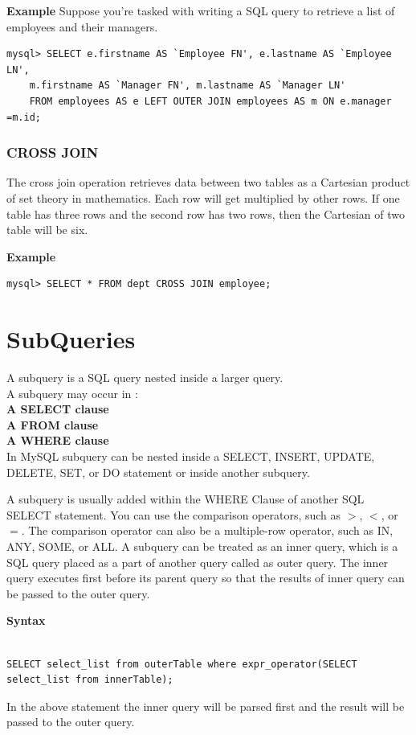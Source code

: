 \documentclass[11pt,a4paper]{article}
\begin{document}
\textbf{Example} Suppose you're tasked with writing a SQL query to retrieve a list of employees and their managers.
\begin{verbatim}mysql> SELECT e.firstname AS `Employee FN', e.lastname AS `Employee LN', 
    m.firstname AS `Manager FN', m.lastname AS `Manager LN' 
    FROM employees AS e LEFT OUTER JOIN employees AS m ON e.manager =m.id;\end{verbatim}

\subsubsection*{CROSS JOIN} The cross join operation retrieves data between two tables as a Cartesian product of set theory in mathematics. Each row will get multiplied by other rows. If one table has three rows and the second row has two rows, then the Cartesian of two table will be six. 

\textbf{Example}

\begin{verbatim}mysql> SELECT * FROM dept CROSS JOIN employee;\end{verbatim}
\section*{SubQueries}
A subquery is a SQL query nested inside a larger query.\\

A subquery may occur in :\\
\textbf{A SELECT clause}\\
\textbf{A FROM clause}\\
\textbf{A WHERE clause}\\

In MySQL subquery can be nested inside a SELECT, INSERT, UPDATE, DELETE, SET, or DO statement or inside another subquery.

A subquery is usually added within the WHERE Clause of another SQL SELECT statement.
You can use the comparison operators, such as $>$, $<$, or $=$. The comparison operator can also be a multiple-row operator, such as IN, ANY, SOME, or ALL.
A subquery can be treated as an inner query, which is a SQL query placed as a part of another query called as outer query.
The inner query executes first before its parent query so that the results of inner query can be passed to the outer query.

\textbf{Syntax}
\begin{verbatim}

SELECT select_list from outerTable where expr_operator(SELECT select_list from innerTable);\end{verbatim}
In the above statement the inner query will be parsed first and the result will be passed to the outer query.
\end{document}

